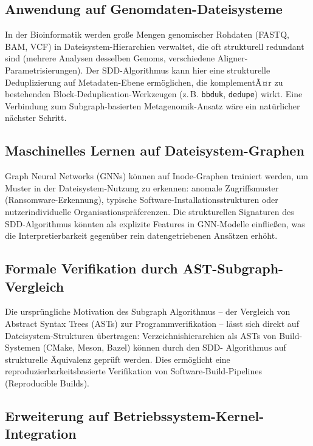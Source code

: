 ﻿\documentclass[a4paper,12pt]{article}
\theoremstyle{definition}
\begin{document}
\subsection{Anwendung auf Genomdaten-Dateisysteme}

In der Bioinformatik werden gro\ss{}e Mengen genomischer Rohdaten
(FASTQ, BAM, VCF) in Dateisystem-Hierarchien verwaltet, die oft
strukturell redundant sind (mehrere Analysen desselben Genoms, verschiedene
Aligner-Parametrisierungen). Der SDD-Algorithmus kann hier eine
strukturelle Deduplizierung auf Metadaten-Ebene erm\"oglichen, die
komplementÃ¤r zu bestehenden Block-Deduplication-Werkzeugen (z.\,B.
\texttt{bbduk}, \texttt{dedupe}) wirkt. Eine Verbindung zum
Subgraph-basierten Metagenomik-Ansatz \cite{epp2026meta} w\"are ein
nat\"urlicher n\"achster Schritt.

\subsection{Maschinelles Lernen auf Dateisystem-Graphen}

Graph Neural Networks (GNNs) k\"onnen auf Inode-Graphen trainiert werden,
um Muster in der Dateisystem-Nutzung zu erkennen: anomale Zugriffsmuster
(Ransomware-Erkennung), typische Software-Installationsstrukturen oder
nutzerindividuelle Organisationspr\"aferenzen. Die strukturellen Signaturen
des SDD-Algorithmus k\"onnten als explizite Features in GNN-Modelle
einflie\ss{}en, was die Interpretierbarkeit gegen\"uber rein datengetriebenen
Ans\"atzen erh\"oht.

\subsection{Formale Verifikation durch AST-Subgraph-Vergleich}

Die urspr\"ungliche Motivation des Subgraph Algorithmus -- der Vergleich
von Abstract Syntax Trees (ASTs) zur Programmverifikation -- l\"asst sich
direkt auf Dateisystem-Strukturen \"ubertragen: Verzeichnishierarchien als
ASTs von Build-Systemen (CMake, Meson, Bazel) k\"onnen durch den SDD-
Algorithmus auf strukturelle \"Aquivalenz gepr\"uft werden. Dies erm\"oglicht
eine reproduzierbarkeitsbasierte Verifikation von Software-Build-Pipelines
(Reproducible Builds).

\subsection{Erweiterung auf Betriebssystem-Kernel-Integration}
\end{document}
